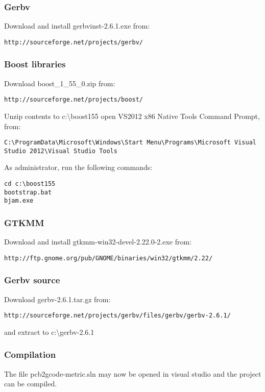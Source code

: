 \documentclass[a4paper,11pt]{article}  %
\begin{document}
\subsubsection{Gerbv}
Download and install gerbvinst-2.6.1.exe from:
\begin{lstlisting}[frame=single,breaklines=true]
http://sourceforge.net/projects/gerbv/
\end{lstlisting}

\subsubsection{Boost libraries}
Download boost\_1\_55\_0.zip from:
\begin{lstlisting}[frame=single,breaklines=true]
http://sourceforge.net/projects/boost/
\end{lstlisting}

Unzip contents to c:\textbackslash boost155
open VS2012 x86 Native Tools Command Prompt, from:
\begin{lstlisting}[frame=single,breaklines=true]
 C:\ProgramData\Microsoft\Windows\Start Menu\Programs\Microsoft Visual Studio 2012\Visual Studio Tools
\end{lstlisting}

As administrator, run the following commands:
\begin{lstlisting}[frame=single,breaklines=true]
cd c:\boost155
bootstrap.bat
bjam.exe
\end{lstlisting}

\subsubsection{GTKMM}
Download and install gtkmm-win32-devel-2.22.0-2.exe from:
\begin{lstlisting}[frame=single,breaklines=true]
http://ftp.gnome.org/pub/GNOME/binaries/win32/gtkmm/2.22/
\end{lstlisting}

\subsubsection{Gerbv source}
Download gerbv-2.6.1.tar.gz from:
\begin{lstlisting}[frame=single,breaklines=true]
http://sourceforge.net/projects/gerbv/files/gerbv/gerbv-2.6.1/
\end{lstlisting}
and extract to c:\textbackslash gerbv-2.6.1

\subsubsection{Compilation}
The file pcb2gcode-metric.sln may now be opened in visual studio and the project can be compiled.

\end{document}
